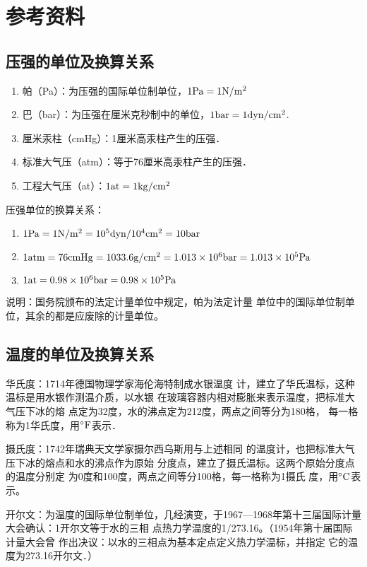 \section{参考资料}
\subsection{压强的单位及换算关系}
\begin{enumerate}
    \item 帕（Pa）：为压强的国际单位制单位，$1{\rm Pa}=1{\rm N/m^2}$
    \item 巴（bar）：为压强在厘米克秒制中的单位，$1{\rm bar}=1{\rm dyn/cm^2}$.
    \item 厘米汞柱（cmHg）：1厘米高汞柱产生的压强．
    \item 标准大气压（atm）：等于76厘米高汞柱产生的压强．
    \item 工程大气压（at）：$1{\rm at}=1{\rm kg/cm^2}$
\end{enumerate}

压强单位的换算关系：
\begin{enumerate}
    \item $1{\rm Pa}=1{\rm N/m^2}=10^5{\rm dyn/10^4 cm^2}=10{\rm bar}$
    \item $1{\rm atm}=76{\rm cmHg}=1033.6{\rm g/cm^2}=1.013\times 10^6{\rm bar}=1.013\times 10^5{\rm Pa}$
    \item $1{\rm at}=0.98\times 10^6{\rm bar}=0.98\times 10^5{\rm Pa}$    
\end{enumerate}

说明：国务院颁布的法定计量单位中规定，帕为法定计量
单位中的国际单位制单位，其余的都是应废除的计量单位。

\subsection{温度的单位及换算关系}
华氏度：1714年德国物理学家海伦海特制成水银温度
计，建立了华氏温标，这种温标是用水银作测温介质，以水银
在玻璃容器内相对膨胀来表示温度，把标准大气压下冰的熔
点定为32度，水的沸点定为212度，两点之间等分为180格，
每一格称为1华氏度，用$^{\circ}{\rm F}$表示．

摄氏度：1742年瑞典天文学家摄尔西乌斯用与上述相同
的温度计，也把标准大气压下冰的熔点和水的沸点作为原始
分度点，建立了摄氏温标。这两个原始分度点的温度分别定
为0度和100度，两点之间等分100格，每一格称为1摄氏
度，用$^{\circ}{\rm C}$表示。

开尔文：为温度的国际单位制单位，几经演变，于1967—1968年第十三届国际计量大会确认：1开尔文等于水的三相
点热力学温度的1/273.16。（1954年第十届国际计量大会曾
作出决议：以水的三相点为基本定点定义热力学温标，并指定
它的温度为273.16开尔文．）

